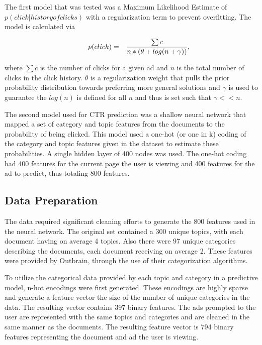 \documentclass[fleqn,10pt]{SelfArx} %
\begin{document}
The first model that was tested was a Maximum Likelihood Estimate of $p(click|history of clicks)$ with a regularization term to prevent overfitting. The model is calculated via

\begin{eqnarray}
    \hspace{0.3in}p(click) &=& \frac{\sum{c}}{n * (\theta + log(n + \gamma))},
\end{eqnarray}

where $\sum{c}$ is the number of clicks for a given ad and $n$ is the total number of clicks in the click history. $\theta$ is a regularization weight that pulls the prior probability distribution towards preferring more general solutions and $\gamma$ is used to guarantee the $log(n)$ is defined for all $n$ and thus is set such that $\gamma << n$.

The second model used for CTR prediction was a shallow neural network that mapped a set of category and topic features from the documents to the probability of being clicked. This model used a one-hot (or one in k) coding of the category and topic features given in the dataset to estimate these probabilities. A single hidden layer of 400 nodes was used. The one-hot coding had 400 features for the current page the user is viewing and 400 features for the ad to predict, thus totaling 800 features.

\subsection{Data Preparation}

The data required significant cleaning efforts to generate the 800 features used in the neural network. The original set contained a 300 unique topics, with each document having on average
4 topics. Also there were 97 unique categories describing the documents, each document receiving on average 2.  These features were provided by Outbrain, through the use of their categorization
algorithms.

To utilize the categorical data provided by each topic and category in a predictive model, n-hot encodings were first generated. These encodings are highly sparse and generate a feature vector the size of the number of unique categories in the data. The resulting vector contains 397 binary features. The ads prompted to the user are represented with the same topics and categories and are 
cleaned in the same manner as the documents. The resulting feature vector is 794 binary features representing the document and ad the user is viewing.
\end{document}
